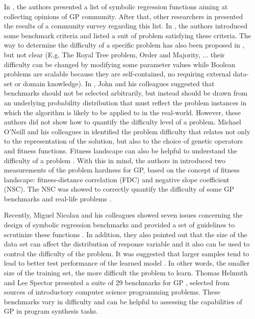 In \cite {2012James}, the authors presented a list of symbolic regression functions aiming at collecting opinions of GP community. After that, other researchers in \cite{David2013} presented the results of a community survey regarding this list. In \cite{2012James}, the authors introduced some benchmark criteria and listed a suit of problem satisfying these criteria. The way to determine the difficulty of a specific problem has also been proposed in \cite{2012James}, but not clear (E.g. The Royal Tree problem, Order and Majority, ... their difficulty can be changed by modifying some parameter values while Boolean problems are scalable because they are self-contained, no requiring external data-set or domain knowledge). In \cite{2014John}, John  and his colleagues suggested that benchmarks should not be selected arbitrarily, but instead should be drawn from an underlying probability distribution that must reflect the problem instances in which the algorithm is likely to be applied to in the real-world. However, these authors did not show how to quantify the difficulty level of a problem. Michael O’Neill and his colleagues in \cite{2010O'Neill} identified the problem difficulty that relates not only to the representation of the solution, but also to the choice of genetic operators and fitness functions.  Fitness landscape can also be helpful to understand the difficulty of a problem \cite{2002Stadle}\cite{1932Wri}. With this in mind, the authors in \cite{2004Vanneschi}\cite{2005Vanneschi} introduced two measurements of the problem hardness for GP, based on the concept of fitness landscape: fitness-distance correlation (FDC) and negative slope coefficient (NSC). The NSC was showed to correctly quantify the difficulty of some GP benchmarks and  real-life problems \cite{2006Vanneschi}. %

Recently, Miguel Nicolau and his colleagues showed seven issues concerning the design of symbolic regression benchmarks and provided a set of guidelines to scrutinize these functions \cite{2015Mig}. In addition, they also pointed out that the size of the data set can affect the distribution of response variable and it also can be used to control the difficulty of the problem. It was suggested that larger samples tend to lead to better test performance of the learned model \cite{2015Mig}. In other words, the smaller size of the training set, the more difficult the problem to learn. Thomas Helmuth and Lee Spector presented a suite of 29 benchmarks for GP \cite{Thomas2015}, selected from sources of introductory computer science programming problems. These benchmarks vary in difficulty and can be helpful to assessing the capabilities of GP in program synthesis tasks. \par

